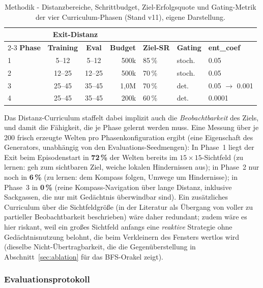 \documentclass[11pt,a4paper]{article}
\begin{document}
\begin{table}[h]
\centering
\small
\begin{tabular}{@{}lccrlll@{}}
\toprule
 & \multicolumn{2}{c}{\textbf{Exit-Distanz}} & & & & \\
\cmidrule(lr){2-3}
\textbf{Phase} & \textbf{Training} & \textbf{Eval} & \textbf{Budget} & \textbf{Ziel-SR} & \textbf{Gating} & \textbf{ent\_coef} \\
\midrule
1 & 5--12 & 5--12 & 500k & 85\,\% & stoch. & 0.05 \\
2 & 12--25 & 12--25 & 500k & 70\,\% & stoch. & 0.05 \\
3 & 25--45 & 35--45 & 1{,}0M & 70\,\% & det. & 0.05 $\to$ 0.001 \\
4 & 25--45 & 35--45 & 200k & 60\,\% & det. & 0.0001 \\
\bottomrule
\end{tabular}
\caption[Curriculum in vier Phasen]{Methodik - Distanzbereiche, Schrittbudget,
Ziel-Erfolgsquote und Gating-Metrik der vier Curriculum-Phasen (Stand v11),
eigene Darstellung.}
\label{tab:curriculum}
\end{table}

Das Distanz-Curriculum staffelt dabei implizit auch die
\emph{Beobachtbarkeit} des Ziels, und damit die Fähigkeit, die je Phase
gelernt werden muss. Eine Messung über je 200 frisch erzeugte Welten pro Phasenkonfiguration
ergibt (eine Eigenschaft des Generators, unabhängig von den
Evaluations-Seedmengen):
In Phase~1 liegt der Exit beim Episodenstart in \textbf{72\,\%} der Welten
bereits im $15\times15$-Sichtfeld (zu lernen: \glqq geh zum sichtbaren Ziel,
weiche lokalen Hindernissen aus\grqq); in Phase~2 nur noch in \textbf{6\,\%}
(zu lernen: dem Kompass folgen, Umwege um Hindernisse); in Phase~3 in
\textbf{0\,\%} (reine Kompass-Navigation über lange Distanz, inklusive
Sackgassen, die nur mit Gedächtnis überwindbar sind). Ein zusätzliches
Curriculum über die Sichtfeldgröße (in der Literatur als Übergang von
voller zu partieller Beobachtbarkeit beschrieben) wäre daher redundant;
zudem wäre es hier riskant, weil ein groß\-es Sichtfeld anfangs eine
\emph{reaktive} Strategie ohne Gedächtnisnutzung belohnt, die beim
Verkleinern des Fensters wertlos wird (dieselbe Nicht-Übertragbarkeit, die
die Gegenüberstellung in Abschnitt~\ref{sec:ablation} für das BFS-Orakel
zeigt).

\subsubsection{Evaluationsprotokoll}
\label{sec:evalprotokoll}
\end{document}
